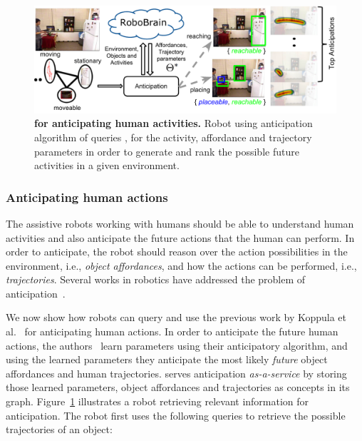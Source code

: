 \begin{figure}
\centering
\includegraphics[width=\linewidth]{./Image/anticipation_robobrain_pic.pdf}
\caption{\textbf{\robobrain{} for anticipating human activities.} Robot using anticipation algorithm of \citet{KoppulaRSS2013} queries \robobrain{}, for the activity, affordance and trajectory parameters in order to generate and rank the possible future activities in a given environment.}
\label{Fig:anticipation}
\end{figure}

\subsubsection{Anticipating human actions}
\label{sec:anticipation}
The assistive robots working with humans should be able to understand human activities and also anticipate the future actions that the human can perform. In order to anticipate, the robot should reason over the action possibilities in the environment, i.e., \textit{object affordances}, and how the actions can be performed, i.e., \textit{trajectories}. Several works in robotics have addressed the problem of anticipation~\citep{KitaniECCV2012,KoppulaRSS2013,Kuderer-RSS-12}.

We now show how robots can query \robobrain{} and use the previous work by
Koppula et al.~\citep{KoppulaRSS2013} for anticipating human actions.  
In order to anticipate the future human actions, the authors~\citep{KoppulaRSS2013} learn parameters using their anticipatory algorithm, and using the learned parameters they anticipate the most likely \textit{future} object affordances and human trajectories. \robobrain{} serves anticipation \textit{as-a-service} by storing those learned parameters, object affordances and trajectories  as concepts in its graph. Figure~\ref{Fig:anticipation} illustrates a robot retrieving relevant information for anticipation. The robot first uses the following queries to retrieve the possible trajectories of an object:

